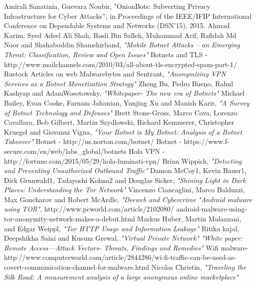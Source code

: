 \documentclass[letterpaper, 10 pt, conference]{ieeeconf}
\begin{document}
\begin{thebibliography}{99}

 Amirali Sanatinia, Guevara Noubir, "OnionBots: Subverting Privacy Infrastructure for Cyber Attacks”, in Proceedings of the IEEE/IFIP International Conference on Dependable Systems and Networks (DSN’15), 2015. 
 Ahmad Karim, Syed Adeel Ali Shah, Rosli Bin Salleh, Muhammad Arif, Rafidah Md Noor and Shahaboddin Shamshirband, \textit{"Mobile Botnet Attacks – an Emerging Threat: Classification, Review and Open Issues"}
 Botnets and TLS - http://www.mailchannels.com/2010/03/all-about-tls-encrypted-spam-part-1/
 Rustock Articles on web
 Malwarebytes and Sentrant, \textit{"Anonymizing VPN Services as a Botnet Monetization Strategy"}
 Zheng Bu, Pedro Bueno, Rahul Kashyap and AdamWosotowsky,  \textit{"Whitepaper- The new era of Botnets"}
 Michael Bailey, Evan Cooke, Farnam Jahanian, Yunjing Xu and Manish Karir, \textit{"A Survey of Botnet Technology and Defenses"}
 Brett Stone-Gross, Marco Cova, Lorenzo Cavallaro, Bob Gilbert, Martin Szydlowski, Richard Kemmerer, Christopher Kruegel and Giovanni Vigna, \textit{"Your Botnet is My Botnet: Analysis of a Botnet Takeover"}
 Botnet - http://us.norton.com/botnet/
 Botnet - https://www.f-secure.com/en/web/labs\_global/botnets
 Hola VPN - http://fortune.com/2015/05/29/hola-luminati-vpn/
  Brian Wippich, \textit{"Detecting and Preventing Unauthorized Outbound Traffic"}
 Damon McCoy1, Kevin Bauer1, Dirk Grunwald1, Tadayoshi Kohno2 and Douglas Sicker, \textit{"Shining Light in Dark Places: Understanding the Tor Network"}
 Vincenzo Ciancaglini, Marco Balduzzi, Max Goncharov and Robert McArdle, \textit{"Deeweb and Cybercrime}
 \textit{"Android malware using TOR"}, http://www.pcworld.com/article/2102080/
android-malware-using-tor-anonymity-network-makes-a-debut.html
 Markus Huber, Martin Mulazzani, and Edgar Weippl, \textit{"Tor HTTP Usage and Information Leakage"}
 Ritika kajal, Deepshikha Saini and Kusum Grewal, \textit{"Virtual Private Network"}
 \textit{"White paper: Remote Access—Attack Vectors- Threats, Findings and Remedies"}
 Wifi malware- http://www.computerworld.com/article/2844286/wi-fi-traffic-can-be-used-as-covert-communication-channel-for-malware.html
 Nicolas Christin, \textit{"Traveling the Silk Road: A measurement analysis of a large anonymous online marketplace"} 

\end{thebibliography}
\end{document}
